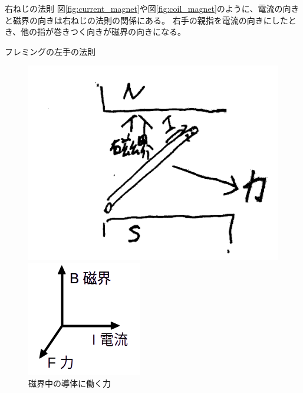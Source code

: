\begin{multicols}{3}
        \begin{itembox}[l]{右ねじの法則}
            図\ref{fig:current_magnet}や図\ref{fig:coil_magnet}のように、電流の向きと磁界の向きは右ねじの法則の関係にある。
            右手の親指を電流の向きにしたとき、他の指が巻きつく向きが磁界の向きになる。
        \end{itembox}

        \begin{itembox}[l]{フレミングの左手の法則}
            \begin{figure}[H]
                \begin{minipage}[t]{0.48\linewidth}
                    \centering
                    \includegraphics[width=1\linewidth]{fig/アンペアの力.png}
                    \caption{磁界中の導体に働く力}
                    \label{fig:ampere_force}
                \end{minipage}
                \begin{minipage}[t]{0.48\linewidth}
                    \centering
                    \includegraphics[width=0.8\linewidth]{fig/左手の法則.png}

\end{minipage}
\end{figure}
\end{itembox}
\end{multicols}
